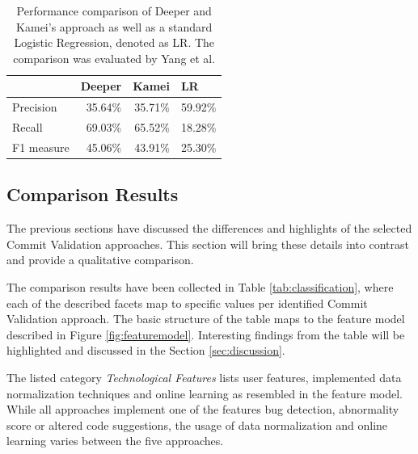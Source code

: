 \begin{table}[t]
	\centering
	\caption{Performance comparison of Deeper and Kamei's approach as well as a standard Logistic Regression, denoted as LR. The comparison was evaluated by Yang et al. \cite{Yang2015}}
	\begin{tabular}{@{}lrrr@{}}
		\toprule
		& \multicolumn{1}{l}{Deeper} & \multicolumn{1}{l}{Kamei} & \multicolumn{1}{l}{LR} \\ \midrule
		Precision  & 35.64\%                    & 35.71\%                   & 59.92\%                \\
		Recall     & 69.03\%                    & 65.52\%                   & 18.28\%                \\
		F1 measure & 45.06\%                    & 43.91\%                   & 25.30\%                \\ \bottomrule
	\end{tabular}
	\label{tab:perfdeeper}
\end{table}



\subsection{Comparison Results}

The previous sections have discussed the differences and highlights of the selected Commit Validation approaches. This section will bring these details into contrast and provide a qualitative comparison.

The comparison results have been collected in Table \ref{tab:classification}, where each of the described facets map to specific values per identified Commit Validation approach. The basic structure of the table maps to the feature model described in Figure \ref{fig:featuremodel}. 
Interesting findings from the table will be highlighted and discussed in the Section \ref{sec:discussion}.

The listed category \textit{Technological Features} lists user features, implemented data normalization techniques and online learning as resembled in the feature model. 
While all approaches implement one of the features bug detection, abnormality score or altered code suggestions, the usage of data normalization and online learning varies between the five approaches.

